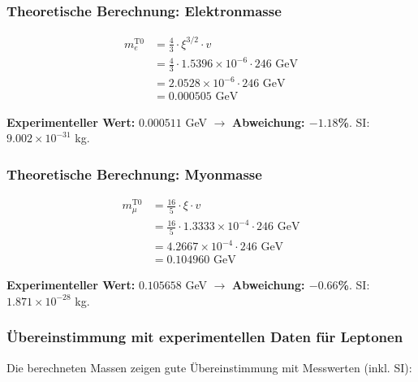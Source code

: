 	\subsubsection{Theoretische Berechnung: Elektronmasse}
	
	\begin{align}
		m_e^{\text{T0}} &= \frac{4}{3} \cdot \xi^{3/2} \cdot v \\
		&= \frac{4}{3} \cdot 1.5396 \times 10^{-6} \cdot 246 \text{ GeV} \\
		&= 2.0528 \times 10^{-6} \cdot 246 \text{ GeV} \\
		&= 0.000505 \text{ GeV}
	\end{align}
	
	\textbf{Experimenteller Wert:} $0.000511$ GeV $\rightarrow$ \textbf{Abweichung: $-1.18$\%}. SI: $9.002 \times 10^{-31}$ kg.
	
	\subsubsection{Theoretische Berechnung: Myonmasse}
	
	\begin{align}
		m_\mu^{\text{T0}} &= \frac{16}{5} \cdot \xi \cdot v \\
		&= \frac{16}{5} \cdot 1.3333 \times 10^{-4} \cdot 246 \text{ GeV} \\
		&= 4.2667 \times 10^{-4} \cdot 246 \text{ GeV} \\
		&= 0.104960 \text{ GeV}
	\end{align}
	
	\textbf{Experimenteller Wert:} $0.105658$ GeV $\rightarrow$ \textbf{Abweichung: $-0.66$\%}. SI: $1.871 \times 10^{-28}$ kg.
	
	\subsubsection{Übereinstimmung mit experimentellen Daten für Leptonen}
	
	Die berechneten Massen zeigen gute Übereinstimmung mit Messwerten (inkl. SI):
	
